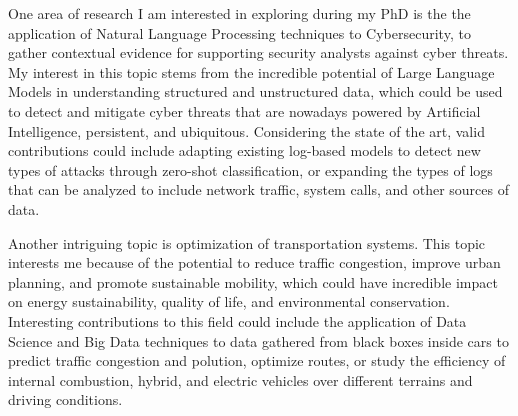 One area of research I am interested in exploring during my PhD is the the application of Natural Language Processing techniques
to Cybersecurity, to gather contextual evidence for supporting security analysts against cyber threats. My interest in this topic stems from the incredible potential of Large Language Models in understanding structured and unstructured data, which could be used to detect and mitigate cyber threats that are nowadays powered by Artificial Intelligence, persistent, and ubiquitous. Considering the state of the art, valid contributions could include adapting existing log-based models to detect new types of attacks through zero-shot classification, or expanding the types of logs that can be analyzed to include network traffic, system calls, and other sources of data.

Another intriguing topic is optimization of transportation systems. This topic interests me because of the potential to reduce traffic congestion, improve urban planning, and promote sustainable mobility, which could have incredible impact on energy sustainability, quality of life, and environmental conservation.  Interesting contributions to this field could include the application of Data Science and Big Data techniques to data gathered from black boxes inside cars to predict traffic congestion and polution, optimize routes, or study the efficiency of internal combustion, hybrid, and electric vehicles over different terrains and driving conditions.